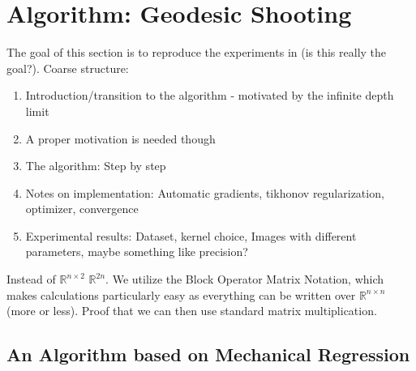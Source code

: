 \section{Algorithm: Geodesic Shooting}

The goal of this section is to reproduce the experiments in \cite{owhadi20} (is this really the goal?).
Coarse structure:
\begin{enumerate}
	\item Introduction/transition to the algorithm - motivated by the infinite depth limit
	\item A proper motivation is needed though
	\item The algorithm: Step by step
	\item Notes on implementation: Automatic gradients, tikhonov regularization, optimizer, convergence
	\item Experimental results: Dataset, kernel choice, Images with different parameters, maybe something like precision?
\end{enumerate}

Instead of $\mathbb{R}^{n\times2}$ $\mathbb{R}^{2n}$.
We utilize the Block Operator Matrix Notation, which makes calculations particularly easy as everything can be written over $\mathbb{R}^{n\times n}$ (more or less).
Proof that we can then use standard matrix multiplication.




\subsection{An Algorithm based on Mechanical Regression}

